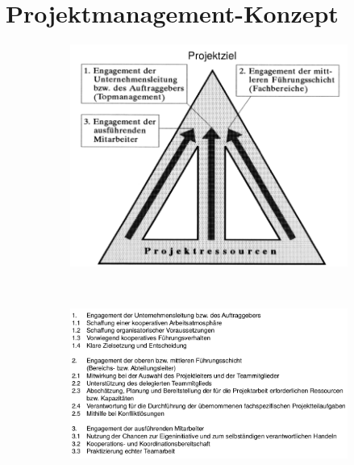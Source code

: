 \documentclass[11pt,a4paper]{article}
\begin{document}
\section{Projektmanagement-Konzept}

\begin{figure}[H]
	\centering
	\caption*{Drei-Säule-Hypothese}
	\begin{subfigure}{0.49\textwidth}
		\includegraphics[width=\textwidth]{ch13/saule}
	\end{subfigure}
	~
	\begin{subfigure}{0.49\textwidth}
		\includegraphics[width=\textwidth]{ch13/saule2}
	\end{subfigure}
\end{figure}
\end{document}
